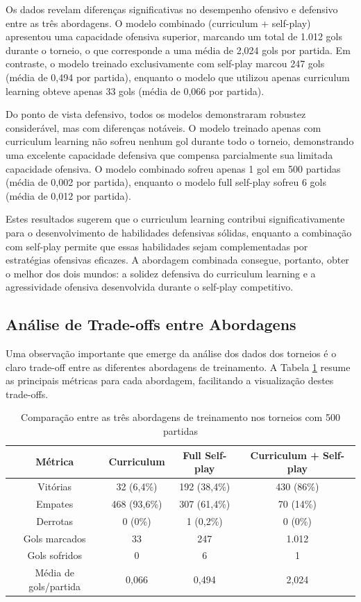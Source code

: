 Os dados revelam diferenças significativas no desempenho ofensivo e defensivo entre as três abordagens. O modelo combinado (curriculum + self-play) apresentou uma capacidade ofensiva superior, marcando um total de 1.012 gols durante o torneio, o que corresponde a uma média de 2,024 gols por partida. Em contraste, o modelo treinado exclusivamente com self-play marcou 247 gols (média de 0,494 por partida), enquanto o modelo que utilizou apenas curriculum learning obteve apenas 33 gols (média de 0,066 por partida).

Do ponto de vista defensivo, todos os modelos demonstraram robustez considerável, mas com diferenças notáveis. O modelo treinado apenas com curriculum learning não sofreu nenhum gol durante todo o torneio, demonstrando uma excelente capacidade defensiva que compensa parcialmente sua limitada capacidade ofensiva. O modelo combinado sofreu apenas 1 gol em 500 partidas (média de 0,002 por partida), enquanto o modelo full self-play sofreu 6 gols (média de 0,012 por partida).

Estes resultados sugerem que o curriculum learning contribui significativamente para o desenvolvimento de habilidades defensivas sólidas, enquanto a combinação com self-play permite que essas habilidades sejam complementadas por estratégias ofensivas eficazes. A abordagem combinada consegue, portanto, obter o melhor dos dois mundos: a solidez defensiva do curriculum learning e a agressividade ofensiva desenvolvida durante o self-play competitivo.

\subsection{Análise de Trade-offs entre Abordagens}

Uma observação importante que emerge da análise dos dados dos torneios é o claro trade-off entre as diferentes abordagens de treinamento. A Tabela \ref{tab:comparacao_abordagens} resume as principais métricas para cada abordagem, facilitando a visualização destes trade-offs.

\begin{table}[H]
    \centering
    \begin{tabular}{|c|c|c|c|}
        \hline
        \textbf{Métrica} & \textbf{Curriculum} & \textbf{Full Self-play} & \textbf{Curriculum + Self-play} \\
        \hline
        Vitórias & 32 (6,4\%) & 192 (38,4\%) & 430 (86\%) \\
        \hline
        Empates & 468 (93,6\%) & 307 (61,4\%) & 70 (14\%) \\
        \hline
        Derrotas & 0 (0\%) & 1 (0,2\%) & 0 (0\%) \\
        \hline
        Gols marcados & 33 & 247 & 1.012 \\
        \hline
        Gols sofridos & 0 & 6 & 1 \\
        \hline
        Média de gols/partida & 0,066 & 0,494 & 2,024 \\
        \hline
    \end{tabular}
    \caption{Comparação entre as três abordagens de treinamento nos torneios com 500 partidas}
    \label{tab:comparacao_abordagens}
\end{table}

